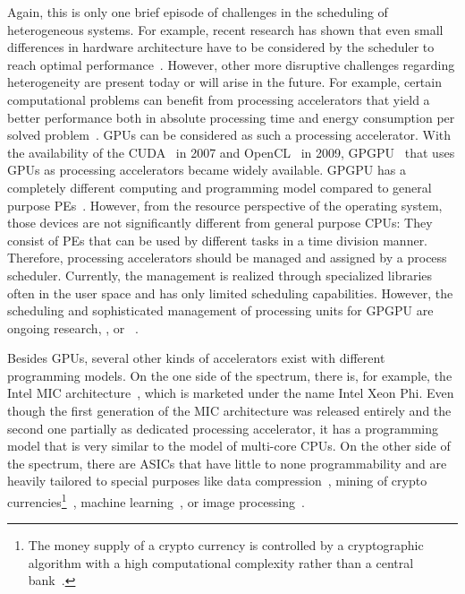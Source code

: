 Again, this is only one brief episode of challenges in the scheduling of heterogeneous systems. For example, recent research has shown that even small differences in hardware architecture have to be considered by the scheduler to reach optimal performance~\cite{Busse-2013-Interdependencies}. However, other more disruptive challenges regarding heterogeneity are present today or will arise in the future. For example, certain computational problems can benefit from processing accelerators that yield a better performance both in absolute processing time and energy consumption per solved problem~\cite{Huang-2009-GPU, Thomas-2009-GPUFPGA, Hamada-2009-GPUFPGA, McIntosh-Smith-2012-CPUGPU, Betkaoui-2010-FPGAGPU}. \acp{GPU} can be considered as such a processing accelerator. With the availability of the \ac{CUDA}~\cite{CUDA} in 2007 and \ac{OpenCL}~\cite{OpenCL} in 2009, \ac{GPGPU}~\cite{Thompson-2002-GPGPU} that uses \acp{GPU} as processing accelerators became widely available. \ac{GPGPU} has a completely different computing and programming model compared to general purpose \acp{PE}~\cite{Stone-2010-OpenCLModel}. However, from the resource perspective of the operating system, those devices are not significantly different from general purpose CPUs: They consist of \acp{PE} that can be used by different tasks in a time division manner. Therefore, processing accelerators should be managed and assigned by a process scheduler. Currently, the management is realized through specialized libraries often in the user space and has only limited scheduling capabilities. However, the scheduling and sophisticated management of processing units for \ac{GPGPU} are ongoing research, \eg, \textcite{Bautin-2008-GPUSCHED} or \citeauthor{Kato-2011-GPUSched}~\cite{Kato-2011-GPUSched,Kato-2012-GPUSched}.

Besides \acp{GPU}, several other kinds of accelerators exist with different programming models. On the one side of the spectrum, there is, for example, the Intel \ac{MIC} architecture~\cite{Intel-2011-mic, Duran-2012-mic}, which is marketed under the name Intel Xeon Phi. Even though the first generation of the \ac{MIC} architecture was released entirely and the second one partially as dedicated processing accelerator, it has a programming model that is very similar to the model of multi-core CPUs. On the other side of the spectrum, there are \acp{ASIC} that have little to none programmability and are heavily tailored to special purposes like \eg{} data compression~\cite{Indra-2007}, mining of crypto currencies\footnote{The money supply of a crypto currency is controlled by a cryptographic algorithm with a high computational complexity rather than a central bank~\cite{Greenberg-2011-bitcoin}.}~\cite{Antminer-2014, Asicminer-2014}, machine learning~\cite{Jouppi-2016-TPU}, or image processing~\cite{Moloney-2014-Myriad}.

